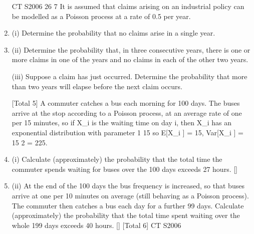 \documentclass[a4paper,12pt]{article}
\begin{document}
\begin{enumerate}


CT S2006
26
7
It is assumed that claims arising on an industrial policy can be modelled as a Poisson
process at a rate of 0.5 per year.
\item (i) Determine the probability that no claims arise in a single year.

\item (ii) Determine the probability that, in three consecutive years, there is one or more
claims in one of the years and no claims in each of the other two years.

(iii) Suppose a claim has just occurred. Determine the probability that more than
two years will elapse before the next claim occurs.

[Total 5]
A commuter catches a bus each morning for 100 days. The buses arrive at the stop
according to a Poisson process, at an average rate of one per 15 minutes, so if X_{i} is the
waiting time on day i, then X_{i} has an exponential distribution with parameter
1
15
so
E[X_{i} ] = 15, Var[X_{i} ] = 15 2 = 225.
\item (i) Calculate (approximately) the probability that the total time the commuter
spends waiting for buses over the 100 days exceeds 27 hours.
[]
\item (ii) At the end of the 100 days the bus frequency is increased, so that buses arrive
at one per 10 minutes on average (still behaving as a Poisson process). The
commuter then catches a bus each day for a further 99 days. Calculate
(approximately) the probability that the total time spent waiting over the
whole 199 days exceeds 40 hours.
[]
[Total 6]
CT S2006




\end{enumerate}
\end{document}
